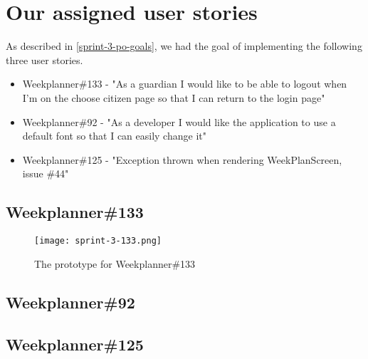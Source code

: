 \section{Our assigned user stories}
As described in \autoref{sprint-3-po-goals}, we had the goal of implementing the following three user stories.
\begin{itemize}\label{item:our-stories-sprint-3}
    \item Weekplanner\#133 - "As a guardian I would like to be able to logout when I'm on the choose citizen page so that I can return to the login page"
    \item Weekplanner\#92 - "As a developer I would like the application to use a default font so that I can easily change it"
    \item Weekplanner\#125 - "Exception thrown when rendering WeekPlanScreen, issue \#44"
\end{itemize}

\subsection{Weekplanner\#133}
\begin{figure}[h]
    \centering
    \texttt{[image: sprint-3-133.png]}
    \caption{The prototype for Weekplanner\#133}
    \label{fig:proto-weekplanner133}
  \end{figure}
\subsection{Weekplanner\#92}
\subsection{Weekplanner\#125}